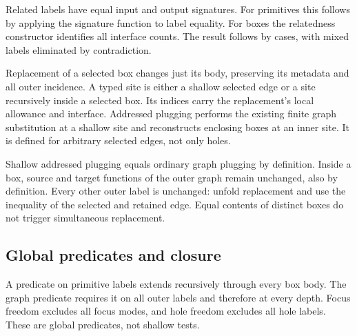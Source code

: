 
Related labels have equal input and output signatures. For primitives this
follows by applying the signature function to label equality. For boxes the
relatedness constructor identifies all interface counts. The result follows
by cases, with mixed labels eliminated by contradiction.



Replacement of a selected box changes just its body, preserving its metadata
and all outer incidence. A typed site is either a shallow selected edge or a
site recursively inside a selected box. Its indices carry the replacement's
local allowance and interface. Addressed plugging performs the existing finite
graph substitution at a shallow site and reconstructs enclosing boxes at an
inner site. It is defined for arbitrary selected edges, not only holes.




Shallow addressed plugging equals ordinary graph plugging by definition.
Inside a box, source and target functions of the outer graph remain unchanged,
also by definition. Every other outer label is unchanged: unfold replacement
and use the inequality of the selected and retained edge. Equal contents of
distinct boxes do not trigger simultaneous replacement.





\subsection{Global predicates and closure}

A predicate on primitive labels extends recursively through every box body.
The graph predicate requires it on all outer labels and therefore at every
depth. Focus freedom excludes all focus modes, and hole freedom excludes all
hole labels. These are global predicates, not shallow tests.

